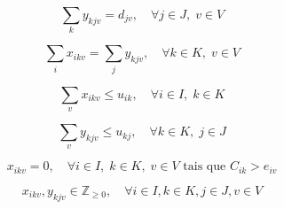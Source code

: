\begin{equation*}
\sum_{k} y_{kjv} = d_{jv}, \quad \forall j \in J, \; v \in V
\end{equation*}

\begin{equation*}
\sum_{i} x_{ikv} = \sum_{j} y_{kjv}, \quad \forall k \in K,\; v \in V
\end{equation*}

\begin{equation*}
\sum_{v} x_{ikv} \le u_{ik}, \quad \forall i \in I, \; k \in K
\end{equation*}

\begin{equation*}
\sum_{v} y_{kjv} \le u_{kj}, \quad \forall k \in K, \; j \in J
\end{equation*}

\begin{equation*}
    x_{ikv} = 0, \quad \forall i \in I, \; k \in K, \; v \in V \text{ tais que } C_{ik} > e_{iv}
\end{equation*}

\begin{equation*}
x_{ikv}, y_{kjv} \in \mathbb{Z}_{\geq 0}, \quad \forall i \in I, k \in K, j \in J, v \in V
\end{equation*}

\bigskip
